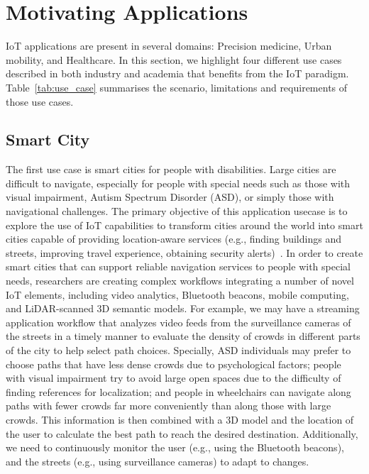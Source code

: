 \section{Motivating Applications}\label{sec:usecases} 
IoT applications are present in several domains: Precision medicine, Urban mobility, and Healthcare. In this section, we highlight four different use cases described in both industry and academia that benefits from the IoT paradigm.  Table~\ref{tab:use_case} summarises the scenario, limitations and requirements of those use cases.


\subsection{Smart City}

The first use case is smart cities for people with disabilities. Large cities are difficult to navigate, especially for people with special needs such as those with visual impairment, Autism Spectrum Disorder (ASD), or simply those with navigational challenges. The primary objective of this application usecase is to explore the use of IoT capabilities to transform cities around the world into smart cities capable of providing location-aware services (e.g., finding buildings and streets, improving travel experience, obtaining security alerts)~\cite{smarHubJie}. In order to create smart cities that can support reliable navigation services to people with special needs, researchers are creating complex workflows integrating a number of novel IoT elements, including video analytics, Bluetooth beacons, mobile computing, and LiDAR-scanned 3D semantic models. For example, we may have a streaming application workflow that analyzes video feeds from the surveillance cameras of the streets in a timely manner to evaluate the density of crowds in different parts of the city to help select path choices. Specially, ASD individuals may prefer to choose paths that have less dense crowds due to psychological factors; people with visual impairment try to avoid large open spaces due to the difficulty of finding references for localization; and people in wheelchairs can navigate along paths with fewer crowds far more conveniently than along those with large crowds. This information is then combined with  a 3D model and the location of the user to calculate the best path to reach the desired destination. Additionally, we need to continuously monitor the user (e.g., using the Bluetooth beacons), and the streets (e.g., using surveillance cameras) to adapt to changes.

